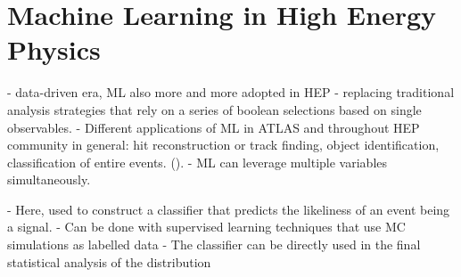 





\chapter{Machine Learning in High Energy Physics}
\label{chap:ml}


- data-driven era, ML also more and more adopted in HEP
- replacing traditional analysis strategies that rely on a series of boolean selections based on single observables.
- Different applications of ML in ATLAS and throughout HEP community in general: hit reconstruction  or track finding, object identification, classification of entire events. ().
- ML can leverage multiple variables simultaneously.

- Here, used to construct a classifier that predicts the likeliness of an event being a signal.
- Can be done with supervised learning techniques that use MC simulations as labelled data
- The classifier can be directly used in the final statistical analysis of the distribution



